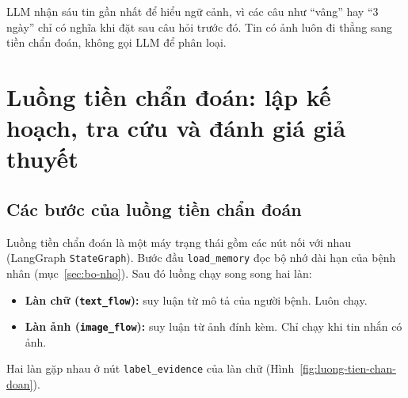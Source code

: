 LLM nhận sáu tin gần nhất để hiểu ngữ cảnh, vì các câu như ``vâng'' hay ``3 ngày'' chỉ có nghĩa khi đặt sau câu hỏi trước đó. Tin có ảnh luôn đi thẳng sang tiền chẩn đoán, không gọi LLM để phân loại.

\section{Luồng tiền chẩn đoán: lập kế hoạch, tra cứu và đánh giá giả thuyết}

\subsection{Các bước của luồng tiền chẩn đoán}

Luồng tiền chẩn đoán là một máy trạng thái gồm các nút nối với nhau (LangGraph \texttt{StateGraph}). Bước đầu \texttt{load\_memory} đọc bộ nhớ dài hạn của bệnh nhân (mục~\ref{sec:bo-nho}). Sau đó luồng chạy song song hai làn:
\begin{itemize}
  \item \textbf{Làn chữ (\texttt{text\_flow}):} suy luận từ mô tả của người bệnh. Luôn chạy.
  \item \textbf{Làn ảnh (\texttt{image\_flow}):} suy luận từ ảnh đính kèm. Chỉ chạy khi tin nhắn có ảnh.
\end{itemize}

Hai làn gặp nhau ở nút \texttt{label\_evidence} của làn chữ (Hình~\ref{fig:luong-tien-chan-doan}).

